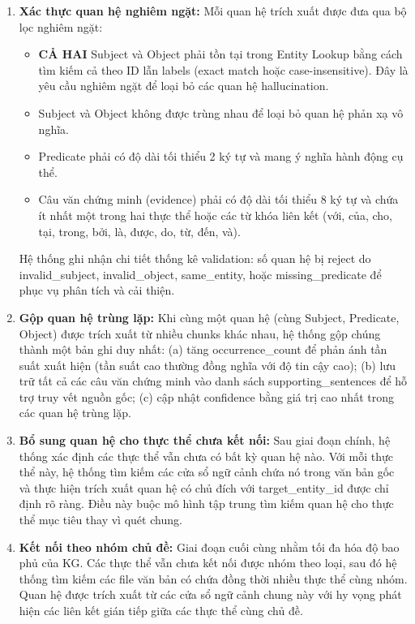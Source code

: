 \begin{enumerate}
    \item \textbf{Xác thực quan hệ nghiêm ngặt:} Mỗi quan hệ trích xuất được đưa qua bộ lọc nghiêm ngặt:
    \begin{itemize}
        \item \textbf{CẢ HAI} Subject và Object phải tồn tại trong Entity Lookup bằng cách tìm kiếm cả theo ID lẫn labels (exact match hoặc case-insensitive). Đây là yêu cầu nghiêm ngặt để loại bỏ các quan hệ hallucination.
        \item Subject và Object không được trùng nhau để loại bỏ quan hệ phản xạ vô nghĩa.
        \item Predicate phải có độ dài tối thiểu 2 ký tự và mang ý nghĩa hành động cụ thể.
        \item Câu văn chứng minh (evidence) phải có độ dài tối thiểu 8 ký tự và chứa ít nhất một trong hai thực thể hoặc các từ khóa liên kết (với, của, cho, tại, trong, bởi, là, được, do, từ, đến, và).
    \end{itemize}
    Hệ thống ghi nhận chi tiết thống kê validation: số quan hệ bị reject do invalid\_subject, invalid\_object, same\_entity, hoặc missing\_predicate để phục vụ phân tích và cải thiện.

    \item \textbf{Gộp quan hệ trùng lặp:} Khi cùng một quan hệ (cùng Subject, Predicate, Object) được trích xuất từ nhiều chunks khác nhau, hệ thống gộp chúng thành một bản ghi duy nhất: (a) tăng occurrence\_count để phản ánh tần suất xuất hiện (tần suất cao thường đồng nghĩa với độ tin cậy cao); (b) lưu trữ tất cả các câu văn chứng minh vào danh sách supporting\_sentences để hỗ trợ truy vết nguồn gốc; (c) cập nhật confidence bằng giá trị cao nhất trong các quan hệ trùng lặp.

    \item \textbf{Bổ sung quan hệ cho thực thể chưa kết nối:} Sau giai đoạn chính, hệ thống xác định các thực thể vẫn chưa có bất kỳ quan hệ nào. Với mỗi thực thể này, hệ thống tìm kiếm các cửa sổ ngữ cảnh chứa nó trong văn bản gốc và thực hiện trích xuất quan hệ có chủ đích với target\_entity\_id được chỉ định rõ ràng. Điều này buộc mô hình tập trung tìm kiếm quan hệ cho thực thể mục tiêu thay vì quét chung.

    \item \textbf{Kết nối theo nhóm chủ đề:} Giai đoạn cuối cùng nhằm tối đa hóa độ bao phủ của KG. Các thực thể vẫn chưa kết nối được nhóm theo loại, sau đó hệ thống tìm kiếm các file văn bản có chứa đồng thời nhiều thực thể cùng nhóm. Quan hệ được trích xuất từ các cửa sổ ngữ cảnh chung này với hy vọng phát hiện các liên kết gián tiếp giữa các thực thể cùng chủ đề.
\end{enumerate}

